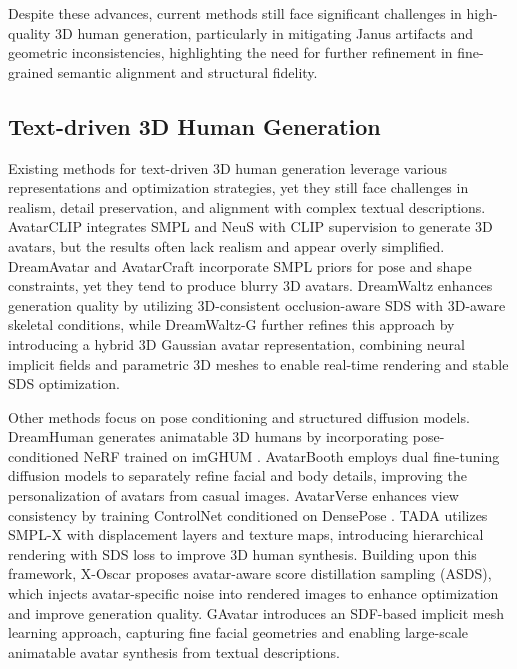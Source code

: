 Despite these advances, current methods still face significant challenges in high-quality 3D human generation, particularly in mitigating Janus artifacts and geometric inconsistencies, highlighting the need for further refinement in fine-grained semantic alignment and structural fidelity.
\subsection{Text-driven 3D Human Generation}\label{2.2}
Existing methods for text-driven 3D human generation leverage various representations and optimization strategies, yet they still face challenges in realism, detail preservation, and alignment with complex textual descriptions. AvatarCLIP \cite{avatarclip} integrates SMPL \cite{spml} and NeuS \cite{neus} with CLIP supervision to generate 3D avatars, but the results often lack realism and appear overly simplified. DreamAvatar \cite{dreamavatar} and AvatarCraft \cite{avatarcraft} incorporate SMPL priors for pose and shape constraints, yet they tend to produce blurry 3D avatars. DreamWaltz \cite{dreamwaltz} enhances generation quality by utilizing 3D-consistent occlusion-aware SDS with 3D-aware skeletal conditions, while DreamWaltz-G \cite{dreamwaltzg} further refines this approach by introducing a hybrid 3D Gaussian avatar representation, combining neural implicit fields and parametric 3D meshes to enable real-time rendering and stable SDS optimization.

Other methods focus on pose conditioning and structured diffusion models. DreamHuman \cite{dreamhuman} generates animatable 3D humans by incorporating pose-conditioned NeRF trained on imGHUM \cite{imghum}. AvatarBooth \cite{avatarbooth} employs dual fine-tuning diffusion models to separately refine facial and body details, improving the personalization of avatars from casual images. AvatarVerse \cite{avatarverse} enhances view consistency by training ControlNet \cite{contronet} conditioned on DensePose \cite{densepose}. TADA \cite{tada} utilizes SMPL-X with displacement layers and texture maps, introducing hierarchical rendering with SDS loss to improve 3D human synthesis. Building upon this framework, X-Oscar \cite{xoscar} proposes avatar-aware score distillation sampling (ASDS), which injects avatar-specific noise into rendered images to enhance optimization and improve generation quality. GAvatar \cite{gavatar} introduces an SDF-based implicit mesh learning approach, capturing fine facial geometries and enabling large-scale animatable avatar synthesis from textual descriptions.

